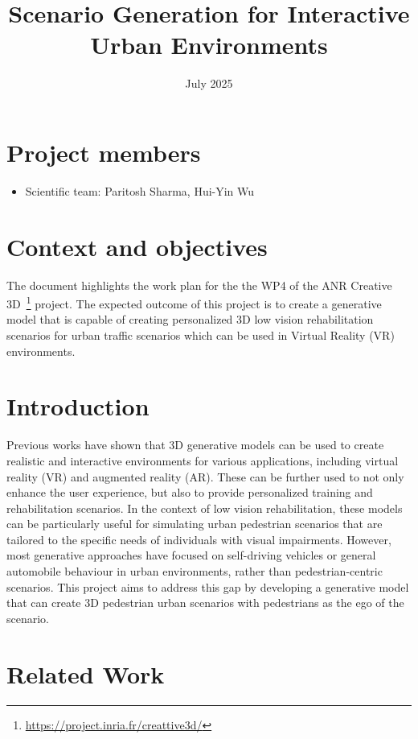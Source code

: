 \documentclass{article}
\title{Scenario Generation for Interactive Urban Environments}
\date{July 2025}
\begin{document}
\maketitle

\section*{Project members}

\begin{itemize}
    \item Scientific team: Paritosh Sharma, Hui-Yin Wu
\end{itemize}

\section{Context and objectives}

The document highlights the work plan for the the WP4 of the ANR Creative 3D~\footnote{\url{https://project.inria.fr/creattive3d/}} project. The expected outcome of this project is to create a generative model that is capable of creating personalized 3D low vision rehabilitation scenarios for urban traffic scenarios which can be used in Virtual Reality (VR) environments.

\section{Introduction}

Previous works have shown that 3D generative models can be used to create realistic and interactive environments for various applications, including virtual reality (VR) and augmented reality (AR). These can be further used to not only enhance the user experience, but also to provide personalized training and rehabilitation scenarios. In the context of low vision rehabilitation, these models can be particularly useful for simulating urban pedestrian scenarios that are tailored to the specific needs of individuals with visual impairments. However, most generative approaches have focused on self-driving vehicles or general automobile behaviour in urban environments, rather than pedestrian-centric scenarios. This project aims to address this gap by developing a generative model that can create 3D pedestrian urban scenarios with pedestrians as the ego of the scenario.

\section{Related Work}
\end{document}
